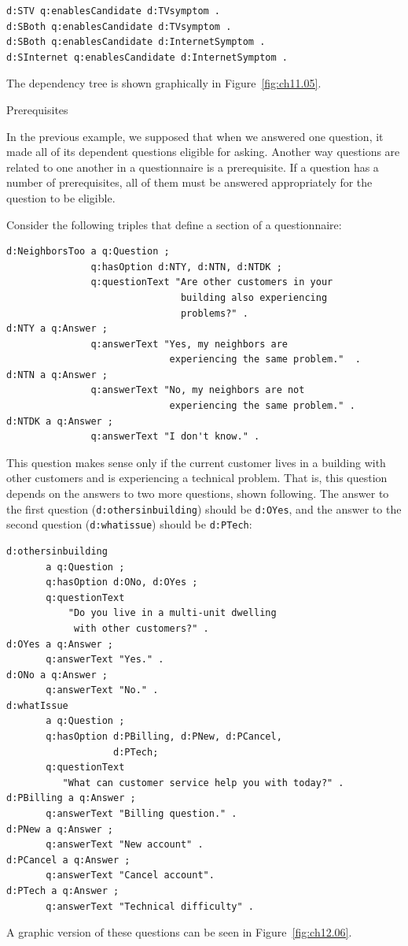 \begin{lstlisting}
d:STV q:enablesCandidate d:TVsymptom .
d:SBoth q:enablesCandidate d:TVsymptom .
d:SBoth q:enablesCandidate d:InternetSymptom .
d:SInternet q:enablesCandidate d:InternetSymptom .
\end{lstlisting}

The dependency tree is shown graphically in Figure~\ref{fig:ch11.05}.

\begin{example}{Prerequisites}

In the previous example, we supposed that when we answered one question,
it made all of its dependent questions eligible for asking. Another way
questions are related to one another in a questionnaire is a
prerequisite. If a question has a number of prerequisites, all of them
must be answered appropriately for the question to be eligible.

Consider the following triples that define a section of a questionnaire:

\begin{lstlisting}
d:NeighborsToo a q:Question ;
               q:hasOption d:NTY, d:NTN, d:NTDK ;
               q:questionText "Are other customers in your 
                               building also experiencing
                               problems?" .
d:NTY a q:Answer ;
               q:answerText "Yes, my neighbors are 
                             experiencing the same problem."  .
d:NTN a q:Answer ;
               q:answerText "No, my neighbors are not 
                             experiencing the same problem." .
d:NTDK a q:Answer ;
               q:answerText "I don't know." .
\end{lstlisting}

This question makes sense only if the current customer lives in a
building with other customers and is experiencing a technical problem.
That is, this question depends on the answers to two more questions,
shown following. The answer to the first question (\texttt{d:othersinbuilding})
should be \texttt{d:OYes}, and the answer to the second question (\texttt{d:whatissue})
should be \texttt{d:PTech}:

\begin{lstlisting}
d:othersinbuilding
       a q:Question ;
       q:hasOption d:ONo, d:OYes ;
       q:questionText
           "Do you live in a multi-unit dwelling 
            with other customers?" .
d:OYes a q:Answer ;
       q:answerText "Yes." .
d:ONo a q:Answer ;
       q:answerText "No." .
d:whatIssue
       a q:Question ;
       q:hasOption d:PBilling, d:PNew, d:PCancel,
                   d:PTech;
       q:questionText
          "What can customer service help you with today?" .
d:PBilling a q:Answer ;
       q:answerText "Billing question." .
d:PNew a q:Answer ;
       q:answerText "New account" .
d:PCancel a q:Answer ;
       q:answerText "Cancel account".  
d:PTech a q:Answer ;
       q:answerText "Technical difficulty" .
\end{lstlisting}

A graphic version of these questions can be seen in Figure~\ref{fig:ch12.06}.
\end{example}
